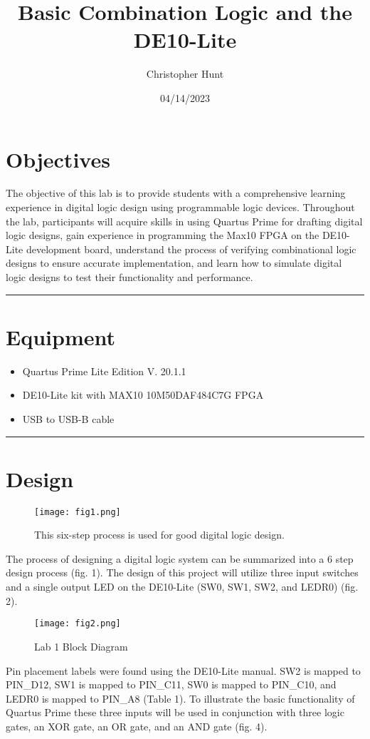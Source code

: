 \documentclass[11pt]{article}
\title{\textbf{{\huge Basic Combination Logic and the DE10-Lite}}}
\author{Christopher Hunt}
\date{04/14/2023}
\begin{document}
\pagestyle{fancy}
\fancyhf{}
\rhead{\thepage}
\maketitle
\section*{\textcolor{mycolor}{Objectives}}

The objective of this lab is to provide students with a comprehensive learning experience in digital logic design using programmable logic devices. Throughout the lab, participants will acquire skills in using Quartus Prime for drafting digital logic designs, gain experience in programming the Max10 FPGA on the DE10-Lite development board, understand the process of verifying combinational logic designs to ensure accurate implementation, and learn how to simulate digital logic designs to test their functionality and performance. 

\vspace{5mm}
\hrule

\section*{\textcolor{mycolor}{Equipment}}
\begin{itemize}
  \item Quartus Prime Lite Edition V. 20.1.1
  \item DE10-Lite kit with MAX10 10M50DAF484C7G FPGA
  \item USB to USB-B cable
\end{itemize}

\vspace{5mm}
\hrule

\section*{\textcolor{mycolor}{Design}}
\begin{figure}[H]
  \centering
  \texttt{[image: fig1.png]}
  \caption{This six-step process is used for good digital logic design.}
  \label{fig:1}
\end{figure}

The process of designing a digital logic system can be summarized into a 6 step design process (fig. 1). The design of this project will utilize three input switches and a single output LED on the DE10-Lite (SW0, SW1, SW2, and LEDR0) (fig. 2). 
\begin{figure}[H]
  \centering
  \texttt{[image: fig2.png]}
  \caption{Lab 1 Block Diagram}
  \label{fig:2}
\end{figure}
Pin placement labels were found using the DE10-Lite manual. SW2 is mapped to PIN\_D12, SW1 is mapped to PIN\_C11, SW0 is mapped to PIN\_C10, and LEDR0 is mapped to PIN\_A8 (Table 1). To illustrate the basic functionality of Quartus Prime these three inputs will be used in conjunction with three logic gates, an XOR gate, an OR gate, and an AND gate (fig. 4).
\end{document}
